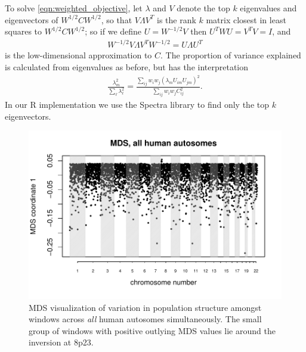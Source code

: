 \documentclass[11pt, oneside]{article}   	%
\begin{document}
To solve \eqref{eqn:weighted_objective},
let $\lambda$ and $V$ denote the top $k$ eigenvalues and eigenvectors of $W^{1/2} C W^{1/2}$,
so that $V \Lambda V^T$ is the rank $k$ matrix closest in least squares to $W^{1/2} C W^{1/2}$;
so if we define $U = W^{-1/2} V$
then $U^T W U = V^T V = I$,
and 
\begin{align*}
    W^{-1/2} V \Lambda V^T W^{-1/2} 
    =
    U \Lambda U^T
\end{align*}
is the low-dimensional approximation to $C$.
The proportion of variance explained is calculated from eigenvalues as before,
but has the interpretation
\begin{align*}
    \frac{ \lambda_m^2 }{ \sum_\ell \lambda_\ell^2 } 
    = 
    \frac{ \sum_{ij} w_i w_j ( \lambda_m U_{im} U_{jm} )^2 }{ \sum_{ij} w_i w_j C_{ij}^2 } .
\end{align*}
In our R implementation we use the Spectra library \citep{qiu2016rspectra}
to find only the top $k$ eigenvectors.

\begin{figure}
    \begin{center}
       \includegraphics[width=1\textwidth]{FigS_MDS1D_plot_all_chr_human}
    \end{center}
    \caption{
        MDS visualization of variation in population structure amongst windows across \emph{all} human autosomes simultaneously.
        The small group of windows with positive outlying MDS values lie around the inversion at 8p23.
        \label{fig:mds1_along_allchr_human}
    }
\end{figure}
\end{document}
